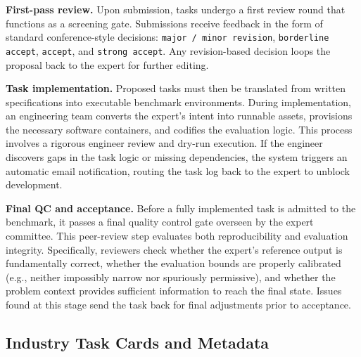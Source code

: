 \documentclass{llmxive}
\begin{document}
\noindent \textbf{First-pass review.}
Upon submission, tasks undergo a first review round that functions as a screening gate. Submissions receive feedback in the form of standard conference-style decisions: \texttt{major / minor revision}, \texttt{borderline accept}, \texttt{accept}, and \texttt{strong accept}. Any revision-based decision loops the proposal back to the expert for further editing.

\noindent \textbf{Task implementation.}
Proposed tasks must then be translated from written specifications into executable benchmark environments. During implementation, an engineering team converts the expert's intent into runnable assets, provisions the necessary software containers, and codifies the evaluation logic. This process involves a rigorous engineer review and dry-run execution. If the engineer discovers gaps in the task logic or missing dependencies, the system triggers an automatic email notification, routing the task log back to the expert to unblock development.

\noindent \textbf{Final QC and acceptance.}
Before a fully implemented task is admitted to the benchmark, it passes a final quality control gate overseen by the expert committee. This peer-review step evaluates both reproducibility and evaluation integrity. Specifically, reviewers check whether the expert's reference output is fundamentally correct, whether the evaluation bounds are properly calibrated (e.g., neither impossibly narrow nor spuriously permissive), and whether the problem context provides sufficient information to reach the final state. Issues found at this stage send the task back for final adjustments prior to acceptance.

\subsection{Industry Task Cards and Metadata}
\label{app:industry-card}

\begingroup



\end{document}
